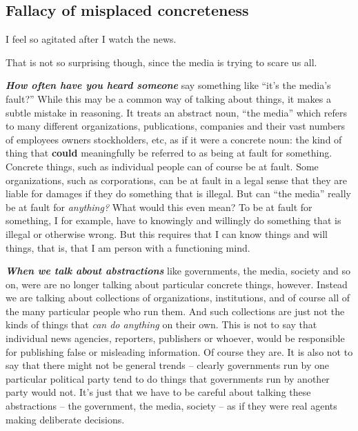 \documentclass[
  12pt, openany]{book}
\begin{document}
\hypertarget{fallacy-of-misplaced-concreteness}{%
\subsection*{Fallacy of misplaced concreteness}\label{fallacy-of-misplaced-concreteness}}


\begin{center}

\begin{argument}

I feel so agitated after I watch the news.

That is not so surprising though, since the media is trying to scare us all.

\end{argument}

\end{center}

\textbf{\emph{How often have you heard someone}} say something like ``it's the media's fault?'' While this may be a common way of talking about things, it makes a subtle mistake in reasoning. It treats an abstract noun, ``the media'' which refers to many different organizations, publications, companies and their vast numbers of employees owners stockholders, etc, as if it were a concrete noun: the kind of thing that \textbf{could} meaningfully be referred to as being at fault for something. Concrete things, such as individual people can of course be at fault. Some organizations, such as corporations, can be at fault in a legal sense that they are liable for damages if they do something that is illegal. But can ``the media'' really be at fault for \emph{anything?} What would this even mean? To be at fault for something, I for example, have to knowingly and willingly do something that is illegal or otherwise wrong. But this requires that I can know things and will things, that is, that I am person with a functioning mind.

\textbf{\emph{When we talk about abstractions}} like governments, the media, society and so on, were are no longer talking about particular concrete things, however. Instead we are talking about collections of organizations, institutions, and of course all of the many particular people who run them. And such collections are just not the kinds of things that \emph{can do anything} on their own. This is not to say that individual news agencies, reporters, publishers or whoever, would be responsible for publishing false or misleading information. Of course they are. It is also not to say that there might not be general trends -- clearly governments run by one particular political party tend to do things that governments run by another party would not. It's just that we have to be careful about talking these abstractions -- the government, the media, society -- as if they were real agents making deliberate decisions.
\end{document}
